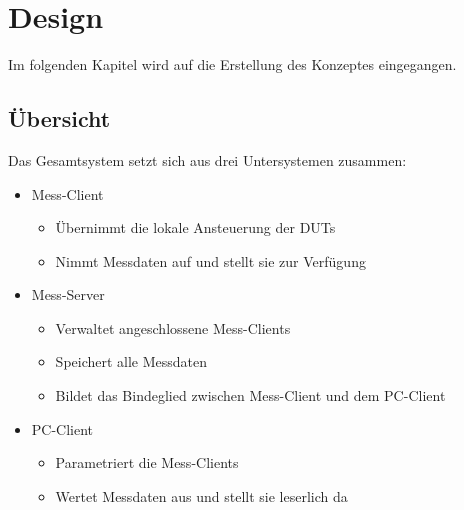 \chapter{Design}
\label{chapter_Design}

Im folgenden Kapitel wird auf die Erstellung des Konzeptes eingegangen.

\section{Übersicht}
\label{section_Teststand}

Das Gesamtsystem setzt sich aus drei Untersystemen zusammen:

\begin{itemize}

\item Mess-Client
\begin{itemize}
\item Übernimmt die lokale Ansteuerung der \acp{DUT}
\item Nimmt Messdaten auf und stellt sie zur Verfügung
\end{itemize}

\item Mess-Server
\begin{itemize}
\item Verwaltet angeschlossene Mess-Clients
\item Speichert alle Messdaten
\item Bildet das Bindeglied zwischen Mess-Client und dem PC-Client
\end{itemize}

\item PC-Client
\begin{itemize}
\item Parametriert die Mess-Clients
\item Wertet Messdaten aus und stellt sie leserlich da
\end{itemize}

\end{itemize}


